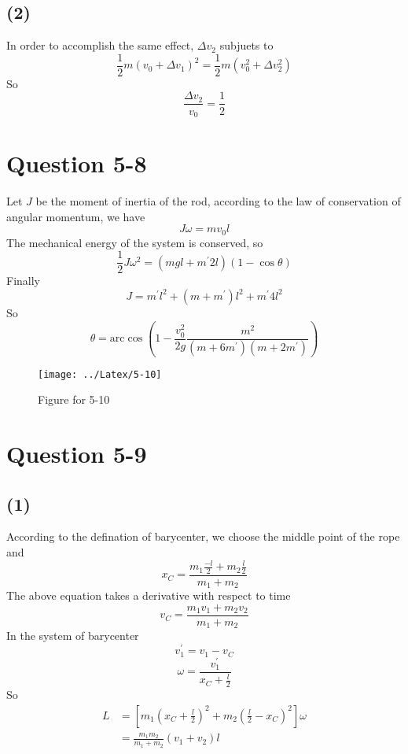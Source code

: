 \documentclass[12pt,a4paper,twocolumn]{article}%
\begin{document}
		\subsection*{(2)}
		\noindent In order to accomplish the same effect, $\Delta v_2$ subjuets to
		\begin{equation}
			\frac{1}{2}m\left( v_0+\Delta v_1 \right) ^2=\frac{1}{2}m\left( {v_0^2}+\Delta {v_2^2} \right) 
		\end{equation}
		So $$\frac{\Delta v_2}{v_0}=\frac{1}{2}$$
		\section{Question 5-8}
		\noindent Let $J$ be the moment of inertia of the rod, according to the law of conservation of angular momentum, we have
		\begin{equation}
			J\omega=mv_0l
		\end{equation}
		The mechanical energy of the system is conserved, so
		\begin{equation}
			\frac{1}{2}J\omega ^2=\left( mgl+m^\prime2l \right) \left( 1-\cos \theta \right)
		\end{equation}
		Finally
		\begin{equation}
			J=m^\prime l^2+\left( m+m^\prime \right) l^2+m^\prime4l^2
		\end{equation}
		So $$\theta =\mathrm{arc}\cos \left( 1-\frac{{v_0^2}}{2g}\frac{m^2}{\left( m+6m^{\prime} \right) \left( m+2m^{\prime} \right)} \right) $$
		\begin{figure*}[t]
			\centering
			\texttt{[image: ../Latex/5-10]}
			\caption*{Figure for 5-10}
			\label{fig:5-10}
		\end{figure*}
		\section{Question 5-9}
		\subsection*{(1)}
		\noindent According to the defination of barycenter, we choose the middle point of the rope and
		\begin{equation}
			x_C=\frac{m_1\frac{-l}{2}+m_2\frac{l}{2}}{m_1+m_2}
		\end{equation}
		The above equation takes a derivative with respect to time
		\begin{equation}
			v_C=\frac{m_1v_1+m_2v_2}{m_1+m_2}
		\end{equation}
		In the system of barycenter
		\begin{equation}
			v_1^\prime=v_1-v_C
		\end{equation}
		\begin{equation}
			\omega=\frac{v_1^\prime}{x_C+\frac{l}{2}}
		\end{equation}
		So
		\begin{align*}
		L&=[m_1(x_C+\frac{l}{2})^2+m_2(\frac{l}{2}-x_C)^2]\omega    \\ &=\frac{m_1m_2}{m_1+m_2}(v_1+v_2)l
		\end{align*}
\end{document}

